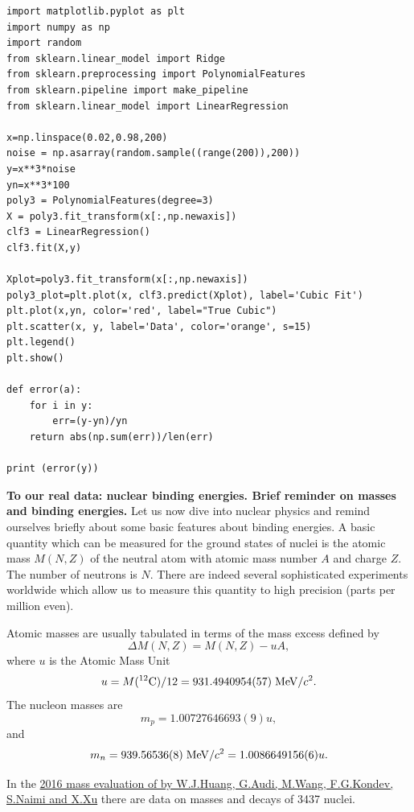 \documentclass{beamer}
\begin{document}
\begin{frame}
\begin{verbatim}
import matplotlib.pyplot as plt
import numpy as np
import random
from sklearn.linear_model import Ridge
from sklearn.preprocessing import PolynomialFeatures
from sklearn.pipeline import make_pipeline
from sklearn.linear_model import LinearRegression

x=np.linspace(0.02,0.98,200)
noise = np.asarray(random.sample((range(200)),200))
y=x**3*noise
yn=x**3*100
poly3 = PolynomialFeatures(degree=3)
X = poly3.fit_transform(x[:,np.newaxis])
clf3 = LinearRegression()
clf3.fit(X,y)

Xplot=poly3.fit_transform(x[:,np.newaxis])
poly3_plot=plt.plot(x, clf3.predict(Xplot), label='Cubic Fit')
plt.plot(x,yn, color='red', label="True Cubic")
plt.scatter(x, y, label='Data', color='orange', s=15)
plt.legend()
plt.show()

def error(a):
    for i in y:
        err=(y-yn)/yn
    return abs(np.sum(err))/len(err)

print (error(y))

\end{verbatim}


\noindent\textbf{To our real data: nuclear binding energies. Brief reminder on masses and binding energies.}
Let us now dive into  nuclear physics and remind ourselves briefly about some basic features about binding
energies.  A basic quantity which can be measured for the ground
states of nuclei is the atomic mass $M(N, Z)$ of the neutral atom with
atomic mass number $A$ and charge $Z$. The number of neutrons is $N$. There are indeed several sophisticated experiments worldwide which allow us to measure this quantity to high precision (parts per million even). 

Atomic masses are usually tabulated in terms of the mass excess defined by
\[
\Delta M(N, Z) =  M(N, Z) - uA,
\]
where $u$ is the Atomic Mass Unit 
\[
u = M(^{12}\mathrm{C})/12 = 931.4940954(57) \hspace{0.1cm} \mathrm{MeV}/c^2.
\]
The nucleon masses are
\[
m_p =  1.00727646693(9)u,
\] 
and
\[
m_n = 939.56536(8)\hspace{0.1cm} \mathrm{MeV}/c^2 = 1.0086649156(6)u.
\]

In the \href{{http://nuclearmasses.org/resources_folder/Wang_2017_Chinese_Phys_C_41_030003.pdf}}{2016 mass evaluation of by W.J.Huang, G.Audi, M.Wang, F.G.Kondev, S.Naimi and X.Xu}
there are data on masses and decays of 3437 nuclei.


\end{frame}
\end{document}
